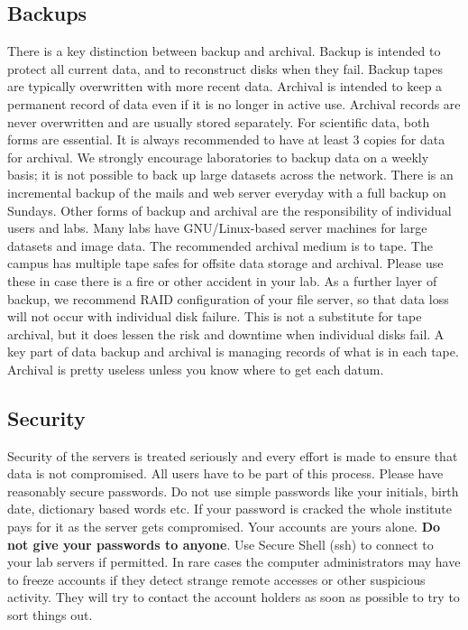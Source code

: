\documentclass[a4paper,10pt]{article}
\begin{document}
\subsection{Backups}
There is a key distinction between backup and archival. Backup is intended to
protect all current data, and to reconstruct disks when they fail. Backup tapes are typically
overwritten with more recent data. Archival is intended to keep a permanent record of data
even if it is no longer in active use. Archival records are never overwritten and are usually
stored separately. For scientific data, both forms are essential. It is always recommended to
have at least 3 copies for data for archival. We strongly encourage laboratories to backup
data on a weekly basis; it is not possible to back up large datasets across the network. There
is an incremental backup of the mails and web server everyday with a full backup on
Sundays. Other forms of backup and archival are the responsibility of individual users and
labs. Many labs have GNU/Linux-based server machines for large datasets and image data.
The recommended archival medium is to tape. The campus has multiple tape safes for
offsite data storage and archival. Please use these in case there is a fire or other accident in
your lab. As a further layer of backup, we recommend RAID configuration of your file
server, so that data loss will not occur with individual disk failure. This is not a substitute for
tape archival, but it does lessen the risk and downtime when individual disks fail. A key part
of data backup and archival is managing records of what is in each tape. Archival is pretty
useless unless you know where to get each datum.

\subsection{Security}
Security of the servers is treated seriously and every effort is made to ensure that
data is not compromised. All users have to be part of this process. Please have reasonably
secure passwords. Do not use simple passwords like your initials, birth date, dictionary
based words etc. If your password is cracked the whole institute pays for it as the server gets
compromised. Your accounts are yours alone. {\bf Do not give your passwords to
anyone}. Use Secure Shell (ssh) to connect to your lab servers if permitted. In rare cases the computer
administrators may have to freeze accounts if they detect strange remote accesses or other
suspicious activity. They will try to contact the account holders as soon as possible to try to
sort things out.
\end{document}

